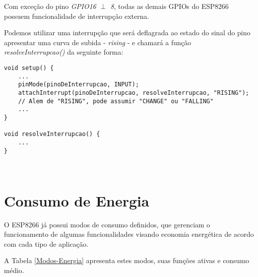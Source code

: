 \documentclass[
	11pt,				%
	openright,			%
	twoside,			%
	a5paper,			%
	english,			%
	french,				%
	spanish,			%
	brazil,				%
	sumario=tradicional
]{abntex2}
\begin{document}
        Com exceção do pino \emph{GPIO16 $\perp$ 8}, todas as demais GPIOs do ESP8266 possuem funcionalidade de interrupção externa.
        
        \vspace{10pt}
        
           \begin{tcolorbox}[colbacktitle=green!50!white!60,
title={\vspace{-13pt}\texttt{[image: notebook.png]} \hspace{2pt} \textsf{\textbf{Na Prática...}\vspace{4pt}}},coltitle=black, colback=white,arc=4mm, outer arc=3.5mm]
\raggedright
    Podemos utilizar uma interrupção que será deflagrada ao estado do sinal do pino apresentar uma curva de subida - \textit{rising} - e chamará a função \emph{resolveInterrupcao()} da seguinte forma:
    
       \begin{lstlisting} 
void setup() {
    ...
    pinMode(pinoDeInterrupcao, INPUT);
    attachInterrupt(pinoDeInterrupcao, resolveInterrupcao, "RISING");
    // Alem de "RISING", pode assumir "CHANGE" ou "FALLING"
    ...
}
    
void resolveInterrupcao() {
    ...
}
    
        
\end{lstlisting}

\end{tcolorbox}


\section{Consumo de Energia}
O ESP8266 já possui modos de consumo definidos, que gerenciam o funcionamento de algumas funcionalidades visando economia energética de acordo com cada tipo de aplicação. 

A Tabela \ref{Modos-Energia} apresenta estes modos, suas funções ativas e consumo médio.

\vspace{10pt}
\end{document}
